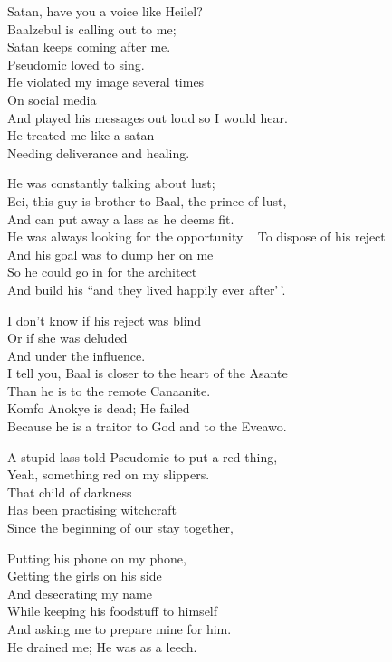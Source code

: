 \documentclass[
]{book}
\begin{document}
Satan, have you a voice like Heilel?\\
Baalzebul is calling out to me;\\
Satan keeps coming after me.\\
Pseudomic loved to sing.\\
He violated my image several times\\
On social media\\
And played his messages out loud so I would hear.\\
He treated me like a satan\\
Needing deliverance and healing.

He was constantly talking about lust;\\
Eei, this guy is brother to Baal, the prince of lust,\\
And can put away a lass as he deems fit.\\
He was always looking for the opportunity ~
To dispose of his reject\\
And his goal was to dump her on me\\
So he could go in for the architect\\
And build his ``and they lived happily ever after'\,'.

I don't know if his reject was blind\\
Or if she was deluded\\
And under the influence.\\
I tell you, Baal is closer to the heart of the Asante\\
Than he is to the remote Canaanite.\\
Komfo Anokye is dead; He failed\\
Because he is a traitor to God and to the Eveawo.

A stupid lass told Pseudomic to put a red thing,\\
Yeah, something red on my slippers.\\
That child of darkness\\
Has been practising witchcraft\\
Since the beginning of our stay together,

Putting his phone on my phone,\\
Getting the girls on his side\\
And desecrating my name\\
While keeping his foodstuff to himself\\
And asking me to prepare mine for him.\\
He drained me; He was as a leech.
\end{document}
